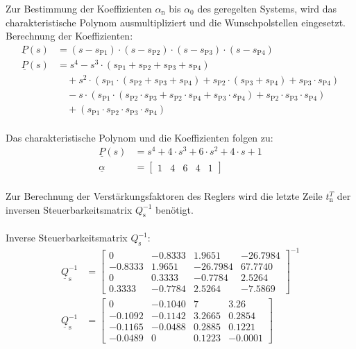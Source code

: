 \documentclass[
	pagesize,
	fontsize=12pt,
	paper=a4,
	oneside,
   reqno
]{scrartcl}
\begin{document}
Zur Bestimmung der Koeffizienten $\alpha_{\mathrm{n}}$ bis $\alpha_{\mathrm{0}}$ des geregelten Systems, wird das charakteristische Polynom ausmultipliziert und die Wunschpolstellen eingesetzt.
Berechnung der Koeffizienten:
\begin{align*}
    \underline{P}(s) &= (s-s_{\mathrm{P1}})\cdot(s-s_{\mathrm{P2}})\cdot(s-s_{\mathrm{P3}})\cdot(s-s_{\mathrm{P4}}) \\
    \underline{P}(s) &= s^4-s^3\cdot(s_{\mathrm{P1}}+s_{\mathrm{P2}}+s_{\mathrm{P3}}+s_{\mathrm{P4}}) \nonumber \\ 
    &\quad +s^2\cdot(s_{\mathrm{P1}}\cdot(s_{\mathrm{P2}}+s_{\mathrm{P3}}+s_{\mathrm{P4}})+s_{\mathrm{P2}}\cdot(s_{\mathrm{P3}}+s_{\mathrm{P4}})+s_{\mathrm{P3}}\cdot s_{\mathrm{P4}}) \nonumber \\
    &\quad -s\cdot(s_{\mathrm{P1}}\cdot(s_{\mathrm{P2}}\cdot s_{\mathrm{P3}}+s_{\mathrm{P2}}\cdot s_{\mathrm{P4}}+s_{\mathrm{P3}}\cdot s_{\mathrm{P4}})+s_{\mathrm{P2}}\cdot s_{\mathrm{P3}}\cdot s_{\mathrm{P4}}) \nonumber \\
    &\quad +(s_{\mathrm{P1}}\cdot s_{\mathrm{P2}}\cdot s_{\mathrm{P3}}\cdot s_{\mathrm{P4}})
\end{align*}\\
Das charakteristische Polynom und die Koeffizienten folgen zu:
\begin{align}
    \underline{P}(s) &= s^4+4\cdot s^3+6\cdot s^2+4\cdot s+1 \nonumber \\
    \underline{\alpha} &=
    \begin{bmatrix}
        1 & 4 & 6 & 4 & 1
    \end{bmatrix} \label{eq:Gleichung38}
\end{align}\\
Zur Berechnung der Verstärkungsfaktoren des Reglers wird die letzte Zeile $t_{\mathrm{n}}^T$ der inversen Steuerbarkeitsmatrix $Q_{\mathrm{s}}^{-1}$ benötigt.\\\\
Inverse Steuerbarkeitsmatrix $Q_{\mathrm{s}}^{-1}$:
\begin{align*}
    \underline{Q}_{\mathrm{s}}^{-1} &=
    \begin{bmatrix}
         0 & -0.8333 & 1.9651 & -26.7984 \\
        -0.8333 & 1.9651 & -26.7984 & 67.7740 \\
        0 & 0.3333 & -0.7784 & 2.5264 \\
        0.3333 & -0.7784 & 2.5264 & -7.5869
    \end{bmatrix}^{-1} \\
    \underline{Q}_{\mathrm{s}}^{-1} &=
    \begin{bmatrix}
        0 & -0.1040 & 7 & 3.26 \\
        -0.1092 & -0.1142 & 3.2665 & 0.2854 \\
        -0.1165 & -0.0488 & 0.2885 & 0.1221 \\
        -0.0489 & 0 & 0.1223 & -0.0001
    \end{bmatrix}
\end{align*}\\
\end{document}

